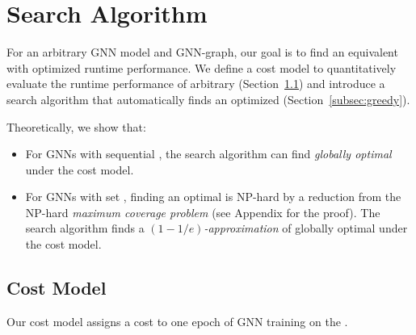 \section{\xg Search Algorithm}
For an arbitrary GNN model and GNN-graph, our goal is to find an equivalent \xg with optimized runtime performance.
We define a cost model to quantitatively evaluate the runtime performance of arbitrary \xgs (Section~\ref{subsec:cost}) and introduce a \xg search algorithm that automatically finds an optimized \xg (Section~\ref{subsec:greedy}).

Theoretically, we show that:
\begin{itemize}
\item For GNNs with sequential , the \xg search algorithm can find {\em globally optimal} \xgs under the cost model.
\item For GNNs with set , finding an optimal \xg is NP-hard by a reduction from the NP-hard {\em maximum coverage problem} (see Appendix for the proof). The \xg search algorithm finds a {\em $(1-1/e)$-approximation} of globally optimal \xgs under the cost model.
\end{itemize}
\subsection{Cost Model}
\label{subsec:cost}
Our cost model assigns a cost to one epoch of GNN training on the \xg.

